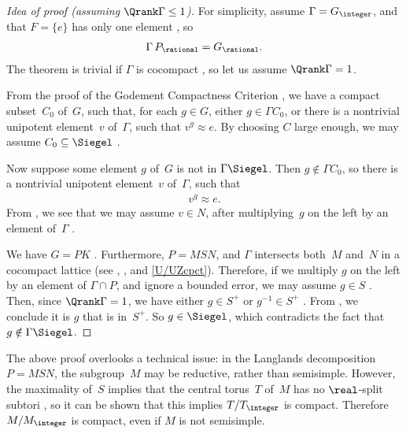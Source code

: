 \begin{proof}[Idea of proof \normalfont (assuming $\Qrank \Gamma \le 1$)]
For simplicity, assume $\Gamma = G_{\integer}$, and that $F = \{e\}$ has only one element , so
	\begin{align} \label{AssumeGzPQ=GQ}
	\Gamma \, P_{\rational} = G_{\rational}
	. \end{align}
The theorem is trivial if $\Gamma$ is cocompact , so let us assume $\Qrank \Gamma = 1$. 

From the proof of the Godement Compactness Criterion , we have a compact subset~$C_0$ of~$G$, such that, for each $g \in G$, either $g \in \Gamma C_0$, or there is a nontrivial unipotent element~$v$ of~$\Gamma$, such that $v^g \approx e$. By choosing $C$ large enough, we may assume $C_0 \subseteq \Siegel$ .

Now suppose some element $g$ of~$G$ is not in $\Gamma \Siegel$.
Then $g \notin \Gamma C_0$, so there is a nontrivial unipotent element~$v$ of~$\Gamma$, such that 
	\begin{align} \label{Siegelvsmall}
	v^g \approx e 
	. \end{align}
From , we see that we may assume $v \in N$, after multiplying~$g$ on the left by an element of~$\Gamma$ .

We have $G = PK$ . Furthermore, $P = MSN$, and $\Gamma$ intersects both~$M$ and~$N$ in a cocompact lattice (see , 
, and \cref{U/UZcpct}).
Therefore, if we multiply $g$ on the left by an element of $\Gamma \cap P$, and ignore a bounded error, we may assume $g \in S$ . Then, since $\Qrank \Gamma = 1$, we have either $g \in S^+$ or $g^{-1} \in S^+$ . From , we conclude it is $g$ that is in~$S^+$. So $g \in \Siegel$, which contradicts the fact that $g \notin \Gamma \Siegel$.
\end{proof}

\begin{rem} \label{SiegelMReductive}
The above proof overlooks a technical issue: in the Langlands decomposition $P = MSN$, the subgroup~$M$ may be reductive, rather than semisimple. However, the maximality of~$S$ implies that the central torus~$T$ of~$M$ has no $\real$-split subtori , so it can be shown that this implies $T/T_{\integer}$ is compact.
Therefore $M/M_\integer$ is compact, even if $M$ is not semisimple.
\end{rem}



